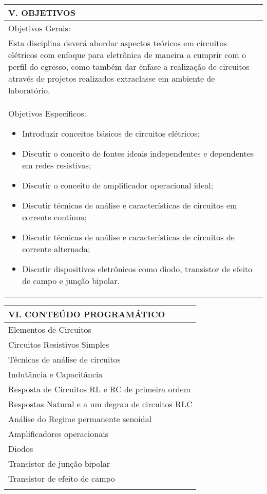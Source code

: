 \documentclass[12pt]{article}
\begin{document}
\begin{longtable}{|L{1.025\textwidth}|} \hline
%
{\bf V. OBJETIVOS } \\ \hline
%
Objetivos Gerais: \\
Esta disciplina deverá abordar aspectos teóricos em circuitos elétricos com enfoque para eletrônica de maneira a cumprir com o perfil do egresso, como também dar ênfase a realização de circuitos através de projetos realizados extraclasse em ambiente de laboratório.
\\
Objetivos Específicos:
\begin{itemize}
\item Introduzir conceitos básicos de circuitos elétricos;
\item Discutir o conceito de fontes ideais independentes e dependentes em redes resistivas;
\item Discutir o conceito de amplificador operacional ideal;
\item Discutir técnicas de análise e características de circuitos em corrente contínua;
\item Discutir técnicas de análise e características de circuitos de corrente alternada;
\item Discutir dispositivos eletrônicos como diodo, transistor de efeito de campo e junção bipolar.
\end{itemize}

\\ \hline
\end{longtable}


\begin{longtable}{|L{1.025\textwidth}|} \hline
%
{\bf VI. CONTEÚDO PROGRAMÁTICO } \\ \hline

Elementos de Circuitos\\
Circuitos Resistivos Simples\\
Técnicas de análise de circuitos\\
Indutância e Capacitância\\
Resposta de Circuitos RL e RC de primeira ordem\\
Respostas Natural e a um degrau de circuitos RLC\\
Análise do Regime permanente senoidal\\
Amplificadores operacionais\\
Diodos\\
Transistor de junção bipolar\\
Transistor de efeito de campo\\
\\ \hline
\end{longtable} 
\end{document}
